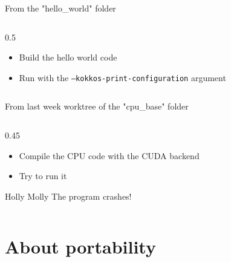 \documentclass[
    aspectratio=169,
]{beamer}
\begin{document}
\begin{exerciseframe}{From the "hello\_world" folder}
    \begin{columns}
        \begin{column}{0.5\linewidth}
            \begin{itemize}
                \item Build the hello world code
                \item Run with the \texttt{--kokkos-print-configuration} argument
            \end{itemize}
        \end{column}
    \end{columns}
\end{exerciseframe}

\begin{exerciseframe}{\small From last week worktree of the "cpu\_base" folder}
    \begin{columns}
        \begin{column}{0.45\linewidth}
            \begin{itemize}
                \item Compile the CPU code with the CUDA backend
                \item Try to run it
            \end{itemize}

            \pause
            \vspace{1em}
            \begin{block}{Holly Molly}
                The program crashes!
            \end{block}
        \end{column}
    \end{columns}
\end{exerciseframe}

\section{About portability}
\end{document}
